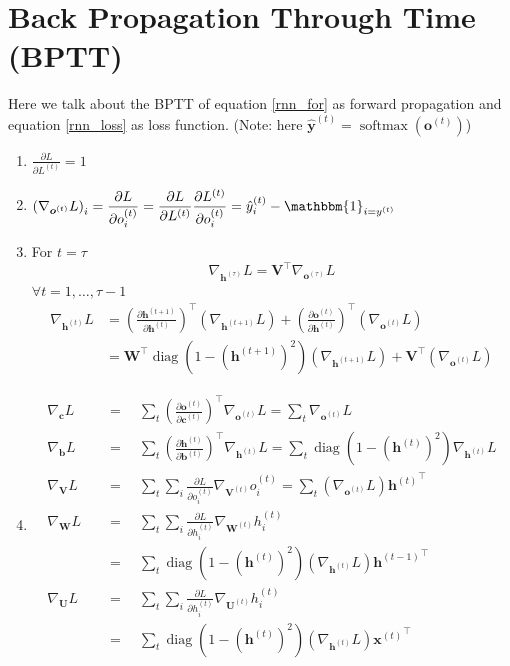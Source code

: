 \documentclass[12pt, a4paper]{article}
\def\vb{\boldsymbol{b}}
\def\vc{\boldsymbol{c}}
\def\vU{\boldsymbol{U}}
\def\vV{\boldsymbol{V}}
\def\vW{\boldsymbol{W}}
\DeclareMathOperator*{\softmax}{softmax}
\DeclareMathOperator*{\diag}{diag}
\newcommand{\egvb}[1]{\boldsymbol{b}^{(#1)}}
\newcommand{\egvc}[1]{\boldsymbol{c}^{(#1)}}
\newcommand{\egvh}[1]{\boldsymbol{h}^{(#1)}}
\newcommand{\egvo}[1]{\boldsymbol{o}^{(#1)}}
\newcommand{\egvx}[1]{\boldsymbol{x}^{(#1)}}
\newcommand{\egvU}[1]{\boldsymbol{U}^{(#1)}}
\newcommand{\egvV}[1]{\boldsymbol{V}^{(#1)}}
\newcommand{\egvW}[1]{\boldsymbol{W}^{(#1)}}
\newcommand{\egh}[1]{h^{(#1)}}
\newcommand{\ego}[1]{o^{(#1)}}
\newcommand{\egy}[1]{y^{(#1)}}
\newcommand{\egL}[1]{L^{(#1)}}
\newcommand{\eghy}[1]{\hat{y}^{(#1)}}
\newcommand{\eghvy}[1]{\hat{\boldsymbol{y}}^{(#1)}}
\newcommand{\pard}[2]{\frac{\partial #1}{\partial #2}}
\newcommand{\tpard}[2]{\left(\frac{\partial #1}{\partial #2}\right)^\top}
\begin{document}
\section{Back Propagation Through Time (BPTT)}
Here we talk about the BPTT of equation \ref{rnn_for} as forward propagation and equation \ref{rnn_loss} as loss function.
(Note: here $\eghvy{t} = \softmax(\egvo{t})$)
\begin{enumerate}
    \item $\displaystyle \pard{L}{\egL{t}} = 1$
    \item $\displaystyle \left( \nabla_{\egvo{t}} L \right)_i 
        = \pard{L}{\ego{t}_i} 
        = \pard{L}{\egL{t}} \pard{\egL{t}}{\ego{t}_i} 
        = \eghy{t}_i - \mathbbm{1}_{i=\egy{t}}$
    \item For $t=\tau$
        \[
            \nabla_{\egvh{\tau}}L = \vV^\top \nabla_{\egvo{\tau}} L  
        \]
        $\forall t = 1,\dots,\tau-1$
        \[
            \begin{split}
                \nabla_{\egvh{t}}L 
                &= \left( \pard{\egvh{t+1}}{\egvh{t}} \right)^\top (\nabla_{\egvh{t+1}}L) 
                + \left( \pard{\egvo{t}}{\egvh{t}} \right)^\top (\nabla_{\egvo{t}}L)
                \\&= \vW^\top \diag\left( 1-\left(\egvh{t+1}\right)^2 \right)(\nabla_{\egvh{t+1}}L) + \vV^\top(\nabla_{\egvo{t}}L)
            \end{split}
        \]
    \item
        \[
            \begin{split}
                \nabla_{\vc}L &\quad=\quad \sum_t\tpard{\egvo{t}}{\egvc{t}} \nabla_{\egvo{t}}L = \sum_t \nabla_{\egvo{t}}L
                \\ \nabla_{\vb}L &\quad=\quad \sum_t\tpard{\egvh{t}}{\egvb{t}} \nabla_{\egvh{t}}L = \sum_t \diag\left(1-\left(\egvh{t}\right)^2\right) \nabla_{\egvh{t}} L
                \\ \nabla_{\vV}L &\quad=\quad \sum_t\sum_i \pard{L}{\ego{t}_i} \nabla_{\egvV{t}} \ego{t}_i = \sum_t (\nabla_{\egvo{t}}L) {\egvh{t}}^\top
                \\ \nabla_{\vW}L &\quad=\quad \sum_t\sum_i \pard{L}{\egh{t}_i} \nabla_{\egvW{t}}\egh{t}_i
                \\&\quad=\quad \sum_t \diag\left(1 - \left(\egvh{t}\right)^2\right) (\nabla_{\egvh{t}} L) {\egvh{t-1}}^\top
                \\ \nabla_{\vU}L &\quad=\quad \sum_t\sum_i \pard{L}{\egh{t}_i} \nabla_{\egvU{t}}\egh{t}_i
                \\&\quad=\quad \sum_t \diag\left(1 - \left(\egvh{t}\right)^2\right) (\nabla_{\egvh{t}} L) {\egvx{t}}^\top
            \end{split}
        \]
\end{enumerate}
\end{document}
